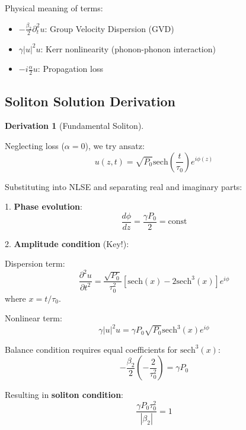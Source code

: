 \documentclass[12pt,a4paper]{article}
\theoremstyle{definition}
\newtheorem{derivation}{Derivation}[section]
\begin{document}
Physical meaning of terms:
\begin{itemize}
\item $-\frac{\beta_2}{2}\partial_t^2u$: Group Velocity Dispersion (GVD)
\item $\gamma|u|^2u$: Kerr nonlinearity (phonon-phonon interaction)
\item $-i\frac{\alpha}{2}u$: Propagation loss
\end{itemize}

\subsection{Soliton Solution Derivation}

\begin{derivation}[Fundamental Soliton]
\label{deriv:soliton}

Neglecting loss ($\alpha=0$), we try ansatz:
\begin{equation}
u(z,t) = \sqrt{P_0}\text{sech}\left(\frac{t}{\tau_0}\right)e^{i\phi(z)}
\end{equation}

Substituting into NLSE and separating real and imaginary parts:

1. \textbf{Phase evolution}:
\begin{equation}
\frac{d\phi}{dz} = \frac{\gamma P_0}{2} = \text{const}
\end{equation}

2. \textbf{Amplitude condition} (Key!):

Dispersion term:
\begin{equation}
\frac{\partial^2 u}{\partial t^2} = \frac{\sqrt{P_0}}{\tau_0^2}\left[\text{sech}(x) - 2\text{sech}^3(x)\right]e^{i\phi}
\end{equation}
where $x = t/\tau_0$.

Nonlinear term:
\begin{equation}
\gamma|u|^2u = \gamma P_0\sqrt{P_0}\text{sech}^3(x)e^{i\phi}
\end{equation}

Balance condition requires equal coefficients for $\text{sech}^3(x)$:
\begin{equation}
-\frac{\beta_2}{2}\left(-\frac{2}{\tau_0^2}\right) = \gamma P_0
\end{equation}

Resulting in \textbf{soliton condition}:
\begin{equation}
\boxed{\frac{\gamma P_0\tau_0^2}{|\beta_2|} = 1}
\label{eq:soliton_condition}
\end{equation}
\end{derivation}
\end{document}
